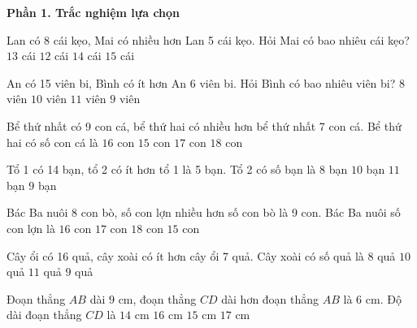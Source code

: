 \textbf{Phần 1. Trắc nghiệm lựa chọn}

\begin{ex} %
Lan có 8 cái kẹo, Mai có nhiều hơn Lan 5 cái kẹo. Hỏi Mai có bao nhiêu cái kẹo?
\choice
{\True $13$ cái}
{$12$ cái}
{$14$ cái}
{$15$ cái}
\end{ex}

\begin{ex} %
An có 15 viên bi, Bình có ít hơn An 6 viên bi. Hỏi Bình có bao nhiêu viên bi?
\choice
{$8$ viên}
{$10$ viên}
{$11$ viên}
{\True $9$ viên}
\end{ex}

\begin{ex} %
Bể thứ nhất có 9 con cá, bể thứ hai có nhiều hơn bể thứ nhất 7 con cá. Bể thứ hai có số con cá là
\choice
{\True $16$ con}
{$15$ con}
{$17$ con}
{$18$ con}
\end{ex}

\begin{ex} %
Tổ 1 có 14 bạn, tổ 2 có ít hơn tổ 1 là 5 bạn. Tổ 2 có số bạn là
\choice
{$8$ bạn}
{$10$ bạn}
{$11$ bạn}
{\True $9$ bạn}
\end{ex}

\begin{ex} %
Bác Ba nuôi 8 con bò, số con lợn nhiều hơn số con bò là 9 con. Bác Ba nuôi số con lợn là
\choice
{$16$ con}
{\True $17$ con}
{$18$ con}
{$15$ con}
\end{ex}

\begin{ex} %
Cây ổi có 16 quả, cây xoài có ít hơn cây ổi 7 quả. Cây xoài có số quả là
\choice
{$8$ quả}
{$10$ quả}
{$11$ quả}
{\True $9$ quả}
\end{ex}

\begin{ex} %
Đoạn thẳng $AB$ dài $9\text{ cm}$, đoạn thẳng $CD$ dài hơn đoạn thẳng $AB$ là $6\text{ cm}$. Độ dài đoạn thẳng $CD$ là
\choice
{$14\text{ cm}$}
{$16\text{ cm}$}
{\True $15\text{ cm}$}
{$17\text{ cm}$}
\end{ex}

